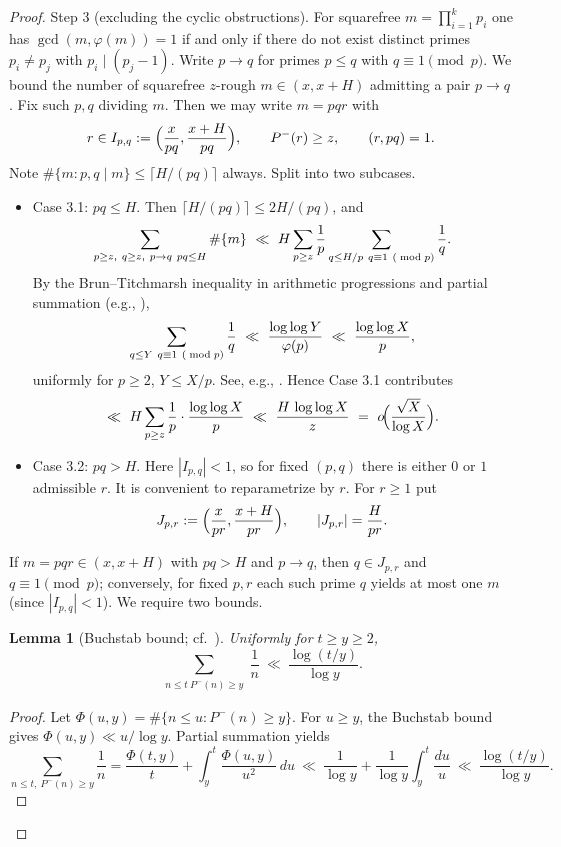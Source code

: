 \documentclass[12pt]{article}
\newtheorem{lemma}{Lemma}[theorem]
\theoremstyle{remark}
\begin{document}
\begin{proof}
Step 3 (excluding the cyclic obstructions). For squarefree $m=\prod_{i=1}^k p_i$ one has $\gcd(m,\varphi(m))=1$ if and only if there do not exist distinct primes $p_i\ne p_j$ with $p_i\mid(p_j-1)$. Write $p\to q$ for primes $p\le q$ with $q\equiv1\pmod p$. We bound the number of squarefree $z$-rough $m\in(x,x+H)$ admitting a pair $p\to q$.
Fix such $p,q$ dividing $m$. Then we may write $m=pqr$ with
\[
r\in I_{p,q}:=\Bigl({x\over pq},{x+H\over pq}\Bigr),\qquad P^-(r)\ge z,\qquad (r,pq)=1.
\]
Note $\#\{m: p,q\mid m\}\le \lceil H/(pq)\rceil$ always. Split into two subcases.
\begin{itemize}
\item Case 3.1: $pq\le H$. Then $\lceil H/(pq)\rceil\le 2H/(pq)$, and
\[
\sum_{\substack{p\ge z,\ q\ge z,\ p\to q\ pq\le H}}\#\{m\}
\ \ll\ H\sum_{p\ge z}{1\over p}\sum_{\substack{q\le H/p\ q\equiv1\ (\bmod p)}}{1\over q}.
\]
By the Brun--Titchmarsh inequality in arithmetic progressions and partial summation (e.g., \cite{MV2007,IK2004}),
\[
\sum_{\substack{q\le Y\ q\equiv1\ (\bmod p)}}{1\over q}\ \ll\ {\log\log Y\over \varphi(p)}\ \ll\ {\log\log X\over p},
\]
uniformly for $p\ge2$, $Y\le X/p$. See, e.g., \cite{MV2007,IK2004}.
Hence Case 3.1 contributes
\[
\ll\ H\sum_{p\ge z}{1\over p}\cdot{\log\log X\over p}\ \ll\ {H\,\log\log X\over z}
\ =\ o\!\Bigl({\sqrt X\over\log X}\Bigr).
\]
\item Case 3.2: $pq>H$. Here $|I_{p,q}|<1$, so for fixed $(p,q)$ there is either $0$ or $1$ admissible $r$. It is convenient to reparametrize by $r$. For $r\ge1$ put
\[
J_{p,r}:=\Bigl({x\over pr},{x+H\over pr}\Bigr),\qquad |J_{p,r}|={H\over pr}.
\]
\end{itemize}
If $m=pqr\in(x,x+H)$ with $pq>H$ and $p\to q$, then $q\in J_{p,r}$ and $q\equiv1\pmod p$; conversely, for fixed $p,r$ each such prime $q$ yields at most one $m$ (since $|I_{p,q}|<1$).
We require two bounds.
\begin{lemma}[Buchstab bound; cf.~\cite{Tenenbaum2015}]\label{lem:buchstab}
Uniformly for $t\ge y\ge2$,
\[
\sum_{\substack{n\le t\ P^-(n)\ge y}}\frac{1}{n}\ \ll\ \frac{\log(t/y)}{\log y}.
\]
\end{lemma}
\begin{proof}
Let $\Phi(u,y)=\#\{n\le u: P^-(n)\ge y\}$. For $u\ge y$, the Buchstab bound gives $\Phi(u,y)\ll u/\log y$. Partial summation yields
\[
\sum_{n\le t,\ P^-(n)\ge y}\frac{1}{n}=\frac{\Phi(t,y)}{t}+\int_y^t\frac{\Phi(u,y)}{u^2}\,du\ \ll\ \frac1{\log y}+\frac1{\log y}\int_y^t\frac{du}{u}\ \ll\ \frac{\log(t/y)}{\log y}.
\]
\end{proof}

\end{proof}
\end{document}
